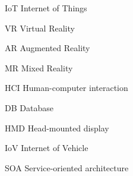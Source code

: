 
\begin{denotation}[3cm]
  \item[IoT] Internet of Things
  \item[VR] Virtual Reality
  \item[AR] Augmented Reality
  \item[MR] Mixed Reality
  \item[HCI] Human-computer interaction
  \item[DB] Database
  \item[HMD] Head-mounted display
  \item[IoV] Internet of Vehicle
  \item[SOA] Service-oriented architecture
\end{denotation}





